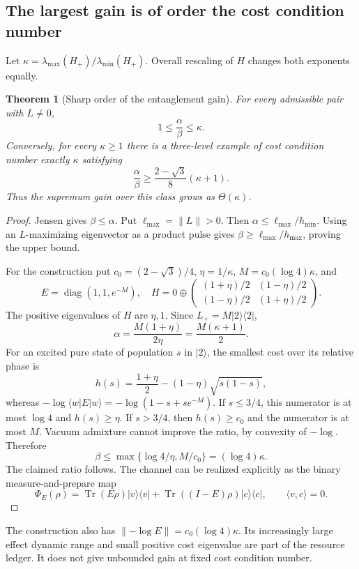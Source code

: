 \documentclass[11pt]{article}
\newtheorem{theorem}{Theorem}[section]
\newcommand{\Tr}{\operatorname{Tr}}
\newcommand{\ket}[1]{|#1\rangle}
\newcommand{\bra}[1]{\langle#1|}
\begin{document}
\subsection{The largest gain is of order the cost condition number}
Let $\kappa=\lambda_{\max}(H_+)/\lambda_{\min}(H_+)$. Overall rescaling of $H$ changes both exponents equally.
\begin{theorem}[Sharp order of the entanglement gain]\label{thm:kappa}
For every admissible pair with $L\ne0$,
\[
 1\leq\frac\alpha\beta\leq\kappa.
\]
Conversely, for every $\kappa\geq1$ there is a three-level example of cost condition number exactly $\kappa$ satisfying
\[
 \frac\alpha\beta\geq \frac{2-\sqrt3}{8}(\kappa+1).
\]
Thus the supremum gain over this class grows as $\Theta(\kappa)$.
\end{theorem}
\begin{proof}
Jensen gives $\beta\leq\alpha$. Put $\ell_{\max}=\|L\|>0$. Then $\alpha\leq\ell_{\max}/h_{\min}$. Using an $L$-maximizing eigenvector as a product pulse gives $\beta\geq\ell_{\max}/h_{\max}$, proving the upper bound.

For the construction put $c_0=(2-\sqrt3)/4$, $\eta=1/\kappa$, $M=c_0(\log4)\kappa$, and
\[
 E=\operatorname{diag}(1,1,e^{-M}),\quad
 H=0\oplus\begin{pmatrix}(1+\eta)/2&(1-\eta)/2\\
 (1-\eta)/2&(1+\eta)/2\end{pmatrix}.
\]
The positive eigenvalues of $H$ are $\eta,1$. Since $L_+=M\ket2\bra2$,
\[
 \alpha=\frac{M(1+\eta)}{2\eta}=\frac{M(\kappa+1)}2.
\]
For an excited pure state of population $s$ in $\ket2$, the smallest cost over its relative phase is
\[
 h(s)=\frac{1+\eta}2-(1-\eta)\sqrt{s(1-s)},
\]
whereas $-\log\bra wE\ket w=-\log(1-s+se^{-M})$.
If $s\leq3/4$, this numerator is at most $\log4$ and $h(s)\geq\eta$. If $s>3/4$, then $h(s)\geq c_0$ and the numerator is at most $M$. Vacuum admixture cannot improve the ratio, by convexity of $-\log$. Therefore
\[
 \beta\leq\max\{\log4/\eta,M/c_0\}=(\log4)\kappa.
\]
The claimed ratio follows. The channel can be realized explicitly as the binary measure-and-prepare map
\[
 \Phi_E(\rho)=\Tr(E\rho)\ket v\bra v+
 \Tr((I-E)\rho)\ket c\bra c,\qquad \langle v,c\rangle=0.
\]
\end{proof}
The construction also has $\|{-\log E}\|=c_0(\log4)\kappa$. Its increasingly large effect dynamic range and small positive cost eigenvalue are part of the resource ledger. It does not give unbounded gain at fixed cost condition number.
\end{document}
